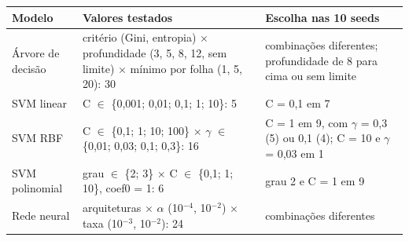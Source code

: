 \begin{tabular}{l>{\raggedright\arraybackslash}p{5.6cm}>{\raggedright\arraybackslash}p{4.2cm}}
\toprule
Modelo & Valores testados & Escolha nas 10 seeds \\
\midrule
Árvore de decisão & critério (Gini, entropia) $\times$ profundidade (3, 5, 8, 12, sem limite) $\times$ mínimo por folha (1, 5, 20): 30 & 8 combinações diferentes; profundidade de 8 para cima ou sem limite \\
SVM linear & C $\in$ \{0,001; 0,01; 0,1; 1; 10\}: 5 & C = 0,1 em 7 \\
SVM RBF & C $\in$ \{0,1; 1; 10; 100\} $\times$ $\gamma$ $\in$ \{0,01; 0,03; 0,1; 0,3\}: 16 & C = 1 em 9, com $\gamma$ = 0,3 (5) ou 0,1 (4); C = 10 e $\gamma$ = 0,03 em 1 \\
SVM polinomial & grau $\in$ \{2; 3\} $\times$ C $\in$ \{0,1; 1; 10\}, coef0 = 1: 6 & grau 2 e C = 1 em 9 \\
Rede neural & 6 arquiteturas $\times$ $\alpha$ (10$^{-4}$, 10$^{-2}$) $\times$ taxa (10$^{-3}$, 10$^{-2}$): 24 & 10 combinações diferentes \\
\bottomrule
\end{tabular}
